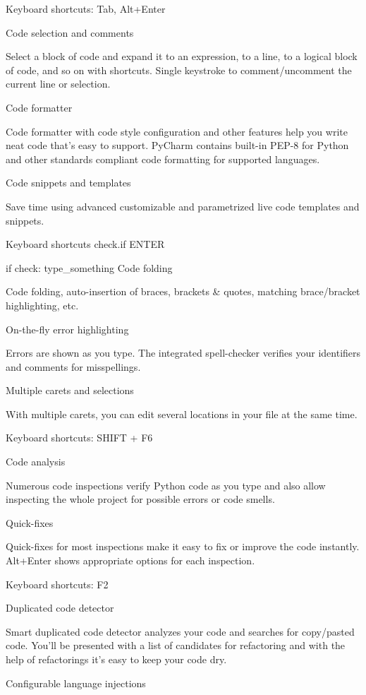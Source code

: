 Keyboard shortcuts: Tab, Alt+Enter

Code selection and comments

Select a block of code and expand it to an expression, to a line, to a logical block of code, and so on with shortcuts. Single keystroke to comment/uncomment the current line or selection.

Code formatter

Code formatter with code style configuration and other features help you write neat code that's easy to support. PyCharm contains built-in PEP-8 for Python and other standards compliant code formatting for supported languages.

Code snippets and templates

Save time using advanced customizable and parametrized live code templates and snippets.

Keyboard shortcuts check.if ENTER

if check:
  type_something
Code folding

Code folding, auto-insertion of braces, brackets & quotes, matching brace/bracket highlighting, etc.

On-the-fly error highlighting

Errors are shown as you type. The integrated spell-checker verifies your identifiers and comments for misspellings.

Multiple carets and selections

With multiple carets, you can edit several locations in your file at the same time.

Keyboard shortcuts: SHIFT + F6

Code analysis

Numerous code inspections verify Python code as you type and also allow inspecting the whole project for possible errors or code smells.

Quick-fixes

Quick-fixes for most inspections make it easy to fix or improve the code instantly. Alt+Enter shows appropriate options for each inspection.

Keyboard shortcuts: F2

Duplicated code detector

Smart duplicated code detector analyzes your code and searches for copy/pasted code. You'll be presented with a list of candidates for refactoring and with the help of refactorings it's easy to keep your code dry.

Configurable language injections

